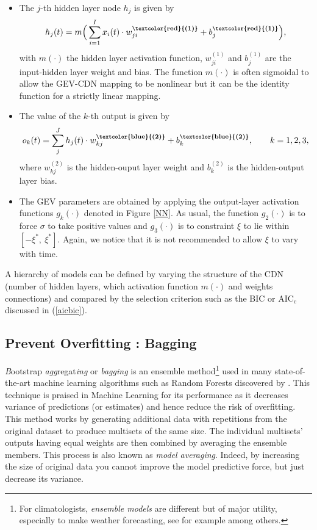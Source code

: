 \begin{itemize} 

\item The $j$-th hidden layer node $h_j$ is given by 
\begin{equation}\label{eq:nnlay1}
h_j(t)=m\Big(\sum_{i=1}^{I}x_i(t)\cdot  w_{ji}^{\textbf{\textcolor{red}{(1)}}}+b_j^{\textbf{\textcolor{red}{(1)}}}\Big),
\end{equation}
with $m(\cdot)$ the hidden layer activation function, $w_{ji}^{(1)}$ and $b_j^{(1)}$ are the input-hidden layer weight and bias. The function $m(\cdot)$ is often sigmoidal to allow the GEV-CDN mapping to be nonlinear but it can be the identity function for a strictly linear mapping.

\item The value of the $k$-th output is given by 
\begin{equation}\label{eq:nnlay2}
o_k(t)=\sum_j^Jh_j(t)\cdot w_{kj}^{\textbf{\textbf{\textcolor{blue}{(2)}}}}+b^{\textbf{\textbf{\textcolor{blue}{(2)}}}}_k, \qquad k=1,2,3 ,
\end{equation}
where $w_{kj}^{(2)}$ is the hidden-ouput layer weight and $b^{(2)}_k$ is the hidden-output layer bias.
	
\item The GEV parameters are obtained by applying the output-layer activation functions $g_k(\cdot)$ denoted in Figure \ref{NN}. As usual, the function $g_2(\cdot)$ is to force $\sigma$ to take positive values and $g_3(\cdot)$ is to constraint $\xi$ to lie within $[-\xi^{*},\ \xi^{*}]$. Again, we notice that it is not recommended to allow $\xi$ to vary with time. 
	
\end{itemize}
A hierarchy of models can be defined by varying the structure of the CDN (number of hidden layers, which activation function $m(\cdot)$ and weights connections)  and compared by the selection criterion such as the BIC or $\text{AIC}_{\text{c}}$ discussed in (\ref{aicbic}). 


\subsection{Prevent Overfitting : Bagging} 


\emph{B}ootstrap \emph{agg}regat\emph{ing} or \emph{bagging} is an ensemble method\footnote{For climatologists, \emph{ensemble models} are different but of major utility, especially to make weather forecasting, see for example \citet{suh_development_2012} among others.} used in many state-of-the-art machine learning algorithms such as Random Forests discovered by \citet{Breiman_2001}. This technique is praised in Machine Learning for its performance as it decreases variance of predictions (or estimates) and hence reduce the risk of overfitting. This method works by generating additional data with repetitions from the original dataset to produce multisets of the same size.
The  individual  multisets’  outputs  having equal  weights  are  then  combined  by  averaging the ensemble members. This process is also known as \emph{model averaging}.
Indeed, by increasing the size of original data you cannot improve the model predictive force, but just decrease its variance.

